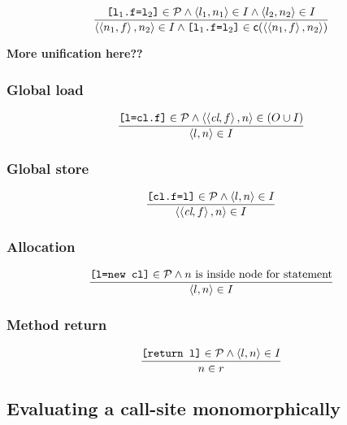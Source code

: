 \documentclass[11pt,notitlepage]{article}
\newcommand{\bigvar}[1]{\ensuremath{\text{\it #1}}}
\newcommand{\func}[1]{\ensuremath{\text{\sffamily #1}}}
\begin{document}
\begin{displaymath}
\dfrac
{\text{\tt [l$_1$.f=l$_2$]}\in\mathcal{P} \wedge
 \tuple{l_1,n_1}\in I \wedge
 \tuple{l_2,n_2}\in I }
{\tuple{\tuple{n_1,f},n_2}\in I \wedge
 \text{\tt [l$_1$.f=l$_2$]}\in \func{c}(\tuple{\tuple{n_1,f},n_2}) }
\end{displaymath}

\textbf{More unification here??}

\subsubsection{Global load}

\begin{displaymath}
\dfrac
{\text{\tt [l=cl.f]}\in\mathcal{P} \wedge
 \tuple{\tuple{\bigvar{cl},f},n}\in (O\cup I) }
{\tuple{l,n}\in I}
\end{displaymath}

\subsubsection{Global store}

\begin{displaymath}
\dfrac
{\text{\tt [cl.f=l]}\in\mathcal{P} \wedge
 \tuple{l,n}\in I}
{\tuple{\tuple{\bigvar{cl},f},n}\in I}
\end{displaymath}

\subsubsection{Allocation}

\begin{displaymath}
\dfrac
{\text{\tt [l=new cl]}\in\mathcal{P} \wedge
 n \text{ is inside node for statement} }
{\left\langle l,n \right\rangle\in I}
\end{displaymath}

\subsubsection{Method return}

\begin{displaymath}
\dfrac
{\text{\tt [return l]}\in\mathcal{P} \wedge
 \left\langle l,n \right\rangle\in I}
{n\in r}
\end{displaymath}


\subsection{Evaluating a call-site monomorphically}
\end{document}
